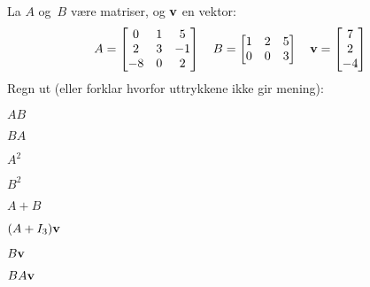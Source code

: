 
\begin{oppgave}
La $A$ og~$B$ være matriser, og $\mathbf{v}$ en vektor:
\[
A =
\begin{bmatrix}
 0 & 1 &  5 \\
 2 & 3 & -1 \\
-8 & 0 & 2
\end{bmatrix}
\quad
B =
\begin{bmatrix}
1 & 2 & 5 \\
0 & 0 & 3
\end{bmatrix}
\quad
\mathbf{v} = \begin{bmatrix} 7 \\ 2 \\ -4 \end{bmatrix}
\]
Regn ut (eller forklar hvorfor uttrykkene ikke gir mening):
\begin{punkt}
$AB$
\end{punkt}
\begin{punkt}
$BA$
\end{punkt}
\begin{punkt}
$A^2$
\end{punkt}
\begin{punkt}
$B^2$
\end{punkt}
\begin{punkt}
$A+B$
\end{punkt}
\begin{punkt}
$(A + I_3) \mathbf{v}$
\end{punkt}
\begin{punkt}
$B\mathbf{v}$
\end{punkt}
\begin{punkt}
$BA\mathbf{v}$
\end{punkt}
\end{oppgave}

